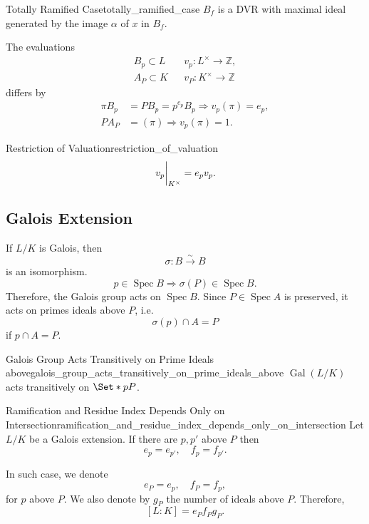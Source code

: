 \documentclass{article}
\begin{document}
\begin{proposition}{Totally Ramified Case}{totally_ramified_case}
    $B_f$ is a DVR with maximal ideal generated by the image $\alpha$ of $x$ in $B_f$.
\end{proposition}

The evaluations
\begin{align*}
    B_p \subset L && v_p:L^\times \rightarrow \mathbb{Z},\\
    A_P \subset K && v_P:K^\times \rightarrow \mathbb{Z}
\end{align*}
differs by
\begin{align*}
    \pi B_p &= PB_p = p^{e_p} B_p \Rightarrow v_p(\pi) = e_p,\\
    PA_P &= (\pi) \Rightarrow v_p(\pi) = 1.
\end{align*}

\begin{proposition}{Restriction of Valuation}{restriction_of_valuation}
    \[ \eval{v_p}_{K^\times} = e_p v_p. \]
\end{proposition}

\subsection{Galois Extension}

If $L/K$ is Galois, then
\[ \sigma: B \xrightarrow{\sim} B \]
is an isomorphism.
\[ p\in \operatorname{Spec} B \Rightarrow \sigma(P) \in \operatorname{Spec} B. \]
Therefore, the Galois group acts on $\operatorname{Spec} B$.
Since $P\in \operatorname{Spec} A$ is preserved, it acts on primes ideals above $P$, i.e.
\[ \sigma(p) \cap A = P \]
if $p\cap A = P$.

\begin{proposition}{Galois Group Acts Transitively on Prime Ideals above}{galois_group_acts_transitively_on_prime_ideals_above}
    $\operatorname{Gal}(L/K)$ acts transitively on $\Set*{p}{P}$.
\end{proposition}

\begin{corollary}{Ramification and Residue Index Depends Only on Intersection}{ramification_and_residue_index_depends_only_on_intersection}
    Let $L/K$ be a Galois extension.
    If there are $p,p'$ above $P$ then
    \[ e_p = e_{p'},\quad f_p = f_{p'}. \]
\end{corollary}

In such case, we denote
\[ e_P = e_p,\quad f_P = f_p, \]
for $p$ above $P$.
We also denote by $g_P$ the number of ideals above $P$.
Therefore,
\[ [L:K] = e_P f_P g_P. \]
\end{document}
